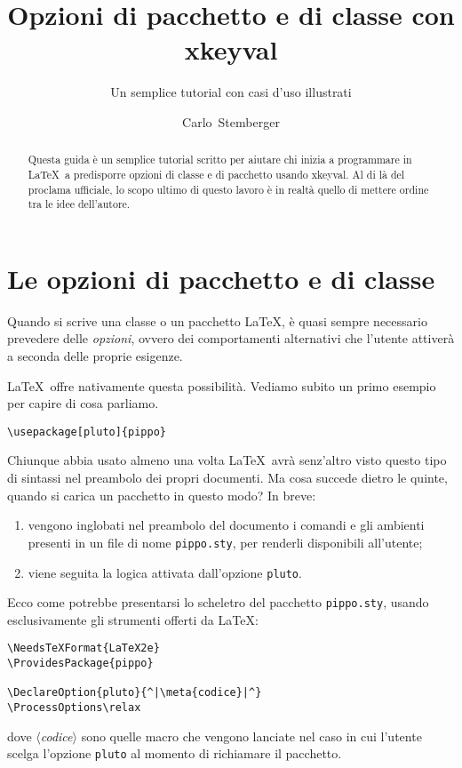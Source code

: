 \documentclass{scrartcl}
\newcommand{\meta}[1]{$\langle$\textit{#1}$\rangle$}
\begin{document}
\title{Opzioni di pacchetto e di classe con xkeyval}
\subtitle{Un semplice tutorial con casi d'uso illustrati}
\author{Carlo~Stemberger}
\publishers{ver.~0.0}
\maketitle

\begin{abstract}
\noindent Questa guida è un semplice tutorial scritto per aiutare chi inizia a programmare in \LaTeX\ a predisporre opzioni di classe e di pacchetto usando xkeyval. Al di là del proclama ufficiale, lo scopo ultimo di questo lavoro è in realtà quello di mettere ordine tra le idee dell'autore.
\end{abstract}

\section{Le opzioni di pacchetto e di classe}
Quando si scrive una classe o un pacchetto \LaTeX, è quasi sempre necessario prevedere delle \emph{opzioni}, ovvero dei comportamenti alternativi che l'utente attiverà a seconda delle proprie esigenze.

\LaTeX\ offre nativamente questa possibilità. Vediamo subito un primo esempio per capire di cosa parliamo.
\begin{lstlisting}
\usepackage[pluto]{pippo}
\end{lstlisting}
Chiunque abbia usato almeno una volta \LaTeX\ avrà senz'altro visto questo tipo di sintassi nel preambolo dei propri documenti. Ma cosa succede dietro le quinte, quando si carica un pacchetto in questo modo? In breve:
\begin{enumerate}
\item vengono inglobati nel preambolo del documento i comandi e gli ambienti presenti in un file di nome \lstinline+pippo.sty+, per renderli disponibili all'utente;
\item viene seguita la logica attivata dall'opzione \lstinline+pluto+.
\end{enumerate}
Ecco come potrebbe presentarsi lo scheletro del pacchetto \lstinline+pippo.sty+, usando esclusivamente gli strumenti offerti da \LaTeX:
\begin{lstlisting}
\NeedsTeXFormat{LaTeX2e}
\ProvidesPackage{pippo}

\DeclareOption{pluto}{^|\meta{codice}|^}
\ProcessOptions\relax
\end{lstlisting}
dove \meta{codice} sono quelle macro che vengono lanciate nel caso in cui l'utente scelga l'opzione \lstinline+pluto+ al momento di richiamare il pacchetto.
\end{document}
